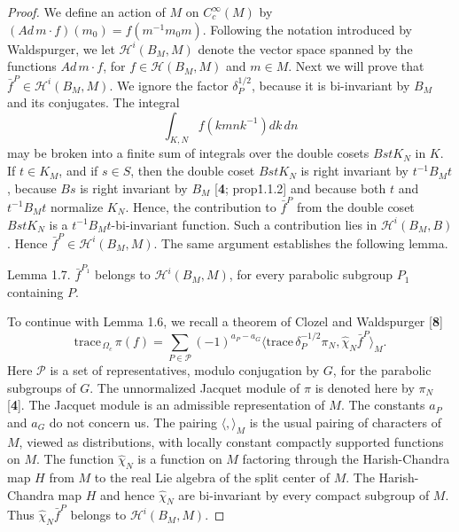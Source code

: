 \documentclass{amsart}
\begin{document}
\begin{proof}
We define an action
of $M$ on $C_c^\infty(M)$ by
  $ (Ad\,m \cdot f) (m_0) = f (m^{-1} m_0 m) $.
Following the notation introduced by Waldspurger, we let 
  $ {\mathcal H}^i (B_M, M) $
denote the vector space spanned by the functions
  $ Ad\,m \cdot f $, for
  $ f \in {\mathcal H} (B_M, M) $ and
  $ m \in M $.
Next we will prove that
  $ \bar f^P \in {\mathcal H}^i (B_M, M) $.
We ignore the factor
  $ \delta_P^{1/2} $, because
it is bi-invariant by 
  $ B_M $
and its conjugates.
The integral
$$\int_{K,N} f(kmnk^{-1}) dk\,dn$$
may be broken into a finite sum of integrals over the double cosets
$BstK_N$ in $K$.   If $t\in K_M$, and if $s\in S$, then the double coset 
$BstK_N$ is right invariant by $t^{-1}B_Mt$, because $Bs$ is right
invariant by $B_M$  [{\bf 4}; prop\. 1.1.2] 
and because both $t$ and $t^{-1}B_Mt$ normalize $K_N$.
Hence, the contribution to $\bar f^P$ from the double coset $BstK_N$
is a $t^{-1}B_Mt$-bi-invariant function.  Such a contribution
lies in ${\mathcal H}^i(B_M,B)$.  Hence $\bar f^P\in {\mathcal H}^i(B_M,M)$.
The same argument establishes the following lemma.

\proclaim Lemma {1.7}. $\bar f^{P_1}$ belongs to ${\mathcal H}^i(B_M,M)$, for
every parabolic subgroup $P_1$ containing $P$.
\finishproclaim

To continue with Lemma 1.6, we recall
a theorem of Clozel and Waldspurger [{\bf 8}]
%
\begin{equation}\label{eqn:1.8}\tag{1.8}
  \text{trace}_{\,\Omega_c} \, \pi (f) =
  \sum_{P \in {\mathcal P}}
  (-1)^{a_P-a_G}
  \big\langle
    \text{trace}\, \delta_P^{-1/2} 
    \pi_N, 
    \hat \chi_N
    \bar f^P 
  \big\rangle_M.
\end{equation}
%
Here
  $ {\mathcal P} $
is a set of representatives, modulo conjugation by $G$, for
the parabolic subgroups of $G$.
The unnormalized Jacquet module of
  $ \pi $ is denoted here by $\pi_N$ 
[{\bf 4}]. The Jacquet module
is an admissible representation of $M$.
The constants
  $ a_P $
and
  $ a_G $
do not concern us.
The pairing
  $ \langle , \rangle _M $
is the usual pairing of characters of $M$,
viewed as distributions, with locally constant compactly
  supported functions on $M$.
  The function
  $ \hat {\chi}_N $
is a function on $M$ factoring through the Harish-Chandra
  map $H$ from $M$ to the
real Lie algebra of the split center of $M$.
The Harish-Chandra map $H$ and hence 
  $ \hat {\chi}_N $ 
are bi-invariant by every compact subgroup of $M$.
Thus
  $ \hat {\chi}_N \bar f^P$ belongs to  $\mathcal H^i(B_M, M) $.


\end{proof}
\end{document}
